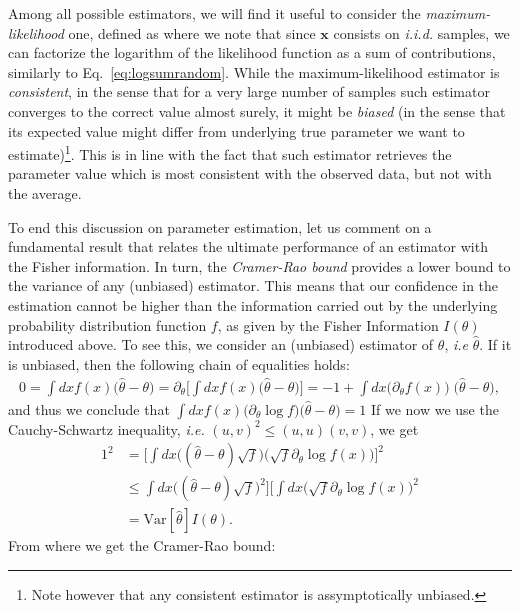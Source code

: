 Among all possible estimators, we will find it useful to consider the \textit{maximum-likelihood} one, defined as
where we note that since $\bm{x}$ consists on \textit{i.i.d.} samples, we can factorize the logarithm of the likelihood function as a sum of contributions, similarly to Eq.~\ref{eq:logsumrandom}. While the maximum-likelihood estimator is \textit{consistent}, in the sense that for a very large number of samples such estimator converges to the correct value almost surely, it might be \textit{biased} (in the sense that its expected value might differ from underlying true parameter we want to estimate)\footnote{Note however that any consistent estimator is assymptotically unbiased.}. This is in line with the fact that such estimator retrieves the parameter value which is most consistent with the observed data, but not with the average.

To end this discussion on parameter estimation, let us comment on a fundamental result that relates the ultimate performance of an estimator with the Fisher information. In turn, the \textit{Cramer-Rao bound} provides a lower bound to the variance of any (unbiased) estimator. This means that our confidence in the estimation cannot be higher than the information carried out by the underlying probability distribution function $f$, as given by the Fisher Information $I(\theta)$ introduced above. To see this, we consider an (unbiased) estimator of $\theta$, \textit{i.e} $\hat{\theta}$. If it is unbiased, then the following chain of equalities holds:
\begin{align*}
0 = \int dx f(x) \big(\hat{\theta}-\theta ) = \partial_\theta \Big[ \int dx f(x) \big(\hat{\theta}-\theta ) \Big] = -1 + \int dx \big(\partial_\theta f(x)\big)\; \big(\hat{\theta}-\theta ),
\end{align*}
and thus we conclude that $\int dx f(x) \big(\partial_\theta \log{f}\big) \big(\hat{\theta}-\theta) = 1$
If we now we use the Cauchy-Schwartz inequality, \textit{i.e.} $(u,v)^2 \leq (u,u) (v,v)$, we get
\begin{align*}
1^2 &= \Big[\int dx \Big((\hat{\theta}-\theta) \sqrt{f} \Big) \Big( \sqrt{f} \partial_\theta \log f(x) \Big) \Big]^2\\
&\leq \int dx \Big((\hat{\theta}-\theta) \sqrt{f} \Big)^2 \Big] \Big[ \int dx \Big( \sqrt{f} \partial_\theta \log f(x) \Big)^2 \\
&=  \text{Var}[\hat{\theta}] I(\theta).
\end{align*}
From where we get the Cramer-Rao bound:

